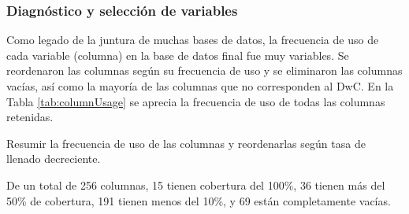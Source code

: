 \documentclass[sn-apa,pdflatex]{sn-jnl}
\newenvironment{Shaded}{\begin{snugshade}}{\end{snugshade}}
\newcommand{\AttributeTok}[1]{\textcolor[rgb]{0.13,0.29,0.53}{#1}}
\newcommand{\CommentTok}[1]{\textcolor[rgb]{0.56,0.35,0.01}{\textit{#1}}}
\newcommand{\DecValTok}[1]{\textcolor[rgb]{0.00,0.00,0.81}{#1}}
\newcommand{\FunctionTok}[1]{\textcolor[rgb]{0.13,0.29,0.53}{\textbf{#1}}}
\newcommand{\NormalTok}[1]{#1}
\newcommand{\OtherTok}[1]{\textcolor[rgb]{0.56,0.35,0.01}{#1}}
\newcommand{\SpecialCharTok}[1]{\textcolor[rgb]{0.81,0.36,0.00}{\textbf{#1}}}
\begin{document}
\subsubsection{Diagnóstico y selección de
variables}\label{diagnuxf3stico-y-selecciuxf3n-de-variables}

Como legado de la juntura de muchas bases de datos, la frecuencia de uso
de cada variable (columna) en la base de datos final fue muy variables.
Se reordenaron las columnas según su frecuencia de uso y se eliminaron
las columnas vacías, así como la mayoría de las columnas que no
corresponden al DwC. En la Tabla \ref{tab:columnUsage} se aprecia la
frecuencia de uso de todas las columnas retenidas.

Resumir la frecuencia de uso de las columnas y reordenarlas según tasa
de llenado decreciente.

\begin{Shaded}
\end{Shaded}

De un total de 256 columnas, 15 tienen cobertura del 100\%, 36 tienen
más del 50\% de cobertura, 191 tienen menos del 10\%, y 69 están
completamente vacías.
\end{document}
